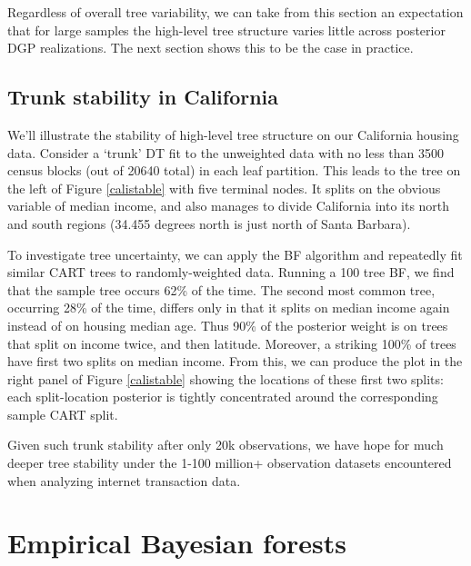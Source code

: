 \documentclass{article}
\begin{document}
Regardless of overall tree variability, we can take from this section an expectation that for large samples the
high-level tree structure varies little across posterior DGP realizations.
The next section shows this to be the case in practice.




\subsection{Trunk stability in California}\label{stability-in-california}


We'll illustrate the stability of high-level tree structure on our California
housing data. Consider a `trunk' DT fit to the unweighted data with no less
than 3500 census blocks (out of 20640 total) in each leaf partition.  This
leads to the tree on the left of Figure \ref{calistable} with five terminal
nodes. It splits on the obvious variable of median income, and also manages to
divide California into its north and south regions (34.455 degrees north is
just north of Santa Barbara).

To investigate tree uncertainty, we can apply the BF algorithm and repeatedly fit similar CART trees to randomly-weighted data.  Running a 100 tree BF, we find that the sample tree occurs 62\% of the time.  The second most common tree, occurring 28\% of the time, differs only in that it splits on median income again instead of on housing median age.  Thus 90\% of the posterior weight is on trees that split on income twice, and then latitude.  Moreover, a striking 100\% of trees have first two splits on median income.  From this, we can produce the plot in the right panel of Figure \ref{calistable} showing the locations of these first two splits: each split-location posterior is tightly concentrated around the corresponding sample CART split.

Given such trunk stability after only 20k observations, we have hope for much deeper tree stability under the 1-100 million+ observation datasets encountered when analyzing internet transaction data.  

\section{Empirical Bayesian forests}
\end{document}
